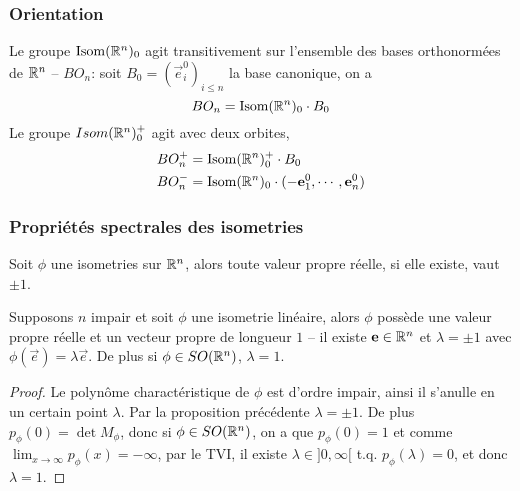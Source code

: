 \subsubsection{Orientation}

\begin{proposition}
	Le groupe $\operatorname{Isom}(\mathbb{R}^n)_0$ agit transitivement sur l'ensemble des bases
	orthonormées de $\mathbb{R}^n$ -- $BO_n$:
	soit $B_0 = (\vec{e}_i^0)_{i \leq n}$ la base canonique, on a
	\begin{equation*}
		BO_n = \operatorname{Isom}(\mathbb{R}^n)_0 \cdot B_0
	\end{equation*}
	Le groupe $Isom(\mathbb{R}^n)_0^+$ agit avec deux orbites,
	\begin{align*}
		BO_n^+ &= \operatorname{Isom}(\mathbb{R}^n)_0^+ \cdot B_0 \\
		BO_n^- &= \operatorname{Isom}(\mathbb{R}^n)_0 \cdot (-\mathbf{e}_1^0, \cdots, \mathbf{e}_n^0)
	\end{align*}
\end{proposition}

\subsubsection{Propriétés spectrales des isometries}

\begin{proposition}
	Soit $\phi$ une isometries sur $\mathbb{R}^n$, alors toute valeur propre réelle, si
	elle existe, vaut $\pm 1$.
\end{proposition}

\begin{proposition}
	Supposons $n$ impair et soit $\phi$ une isometrie linéaire, alors $\phi$
	possède une valeur propre réelle et un vecteur propre de longueur $1$ -- il
	existe $\mathbf{e} \in \mathbb{R}^n$ et $\lambda = \pm 1$ avec $\phi(\vec{e}) = \lambda
	\vec{e}$. De plus si $\phi \in SO(\mathbb{R}^n)$, $\lambda = 1$.
\end{proposition}

\begin{proof}
	Le polynôme charactéristique de $\phi$ est d'ordre impair, ainsi il s'anulle
	en un certain point $\lambda$. Par la proposition précédente $\lambda = \pm
	1$. De plus $p_\phi(0) = \det M_\phi$, donc si $\phi \in SO(\mathbb{R}^n)$, on a que 
	$p_\phi(0) = 1$ et comme $\lim_{x\to \infty} p_\phi(x) = -\infty$, par le
	TVI, il existe $\lambda \in ]0, \infty[$ t.q. $p_\phi(\lambda) = 0$, et donc 
	$\lambda = 1$.
\end{proof}
